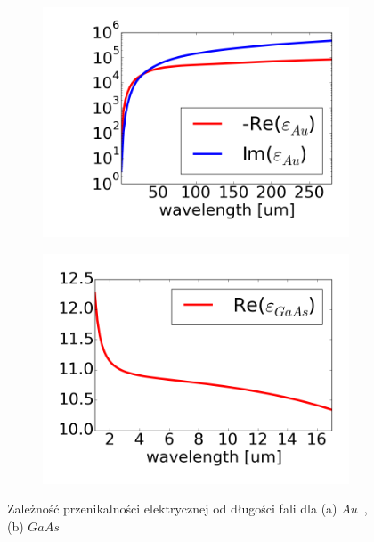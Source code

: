 \begin{figure}[tb]
	\begin{subfigure}{.45\textwidth}
		\includegraphics[width=\textwidth]{images/aueps.png}
		\caption{}
		\label{fig:aueps}
	\end{subfigure}
	\begin{subfigure}{.45\textwidth}
		\includegraphics[width=\textwidth]{images/gaaseps.png}
		\caption{}
		\label{fig:gaaseps}
	\end{subfigure}
	\caption{Zależność przenikalności elektrycznej od długości fali dla (a) $Au$~\cite{ordal1983optical}, (b) $GaAs$~\cite{skauli2003improved}}
\end{figure}

